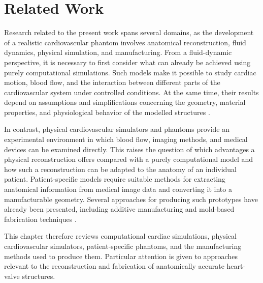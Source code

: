 \chapter{Related Work}\label{chap:related_work}
Research related to the present work spans several domains, as the development of a realistic cardiovascular phantom involves anatomical reconstruction, fluid dynamics, physical simulation, and manufacturing. From a fluid-dynamic perspective, it is necessary to first consider what can already be achieved using purely computational simulations. Such models make it possible to study cardiac motion, blood flow, and the interaction between different parts of the cardiovascular system under controlled conditions. At the same time, their results depend on assumptions and simplifications concerning the geometry, material properties, and physiological behavior of the modelled structures \cite{BAILLARGEON201438,SUGIURA2012380,FEDELE2023115983}.

In contrast, physical cardiovascular simulators and phantoms provide an experimental environment in which blood flow, imaging methods, and medical devices can be examined directly. This raises the question of which advantages a physical reconstruction offers compared with a purely computational model and how such a reconstruction can be adapted to the anatomy of an individual patient. Patient-specific models require suitable methods for extracting anatomical information from medical image data and converting it into a manufacturable geometry. Several approaches for producing such prototypes have already been presented, including additive manufacturing and mold-based fabrication techniques \cite{sobbi2024development,engelhardt2019flexible}. 

This chapter therefore reviews computational cardiac simulations, physical cardiovascular simulators, patient-specific phantoms, and the manufacturing methods used to produce them. Particular attention is given to approaches relevant to the reconstruction and fabrication of anatomically accurate heart-valve structures.

